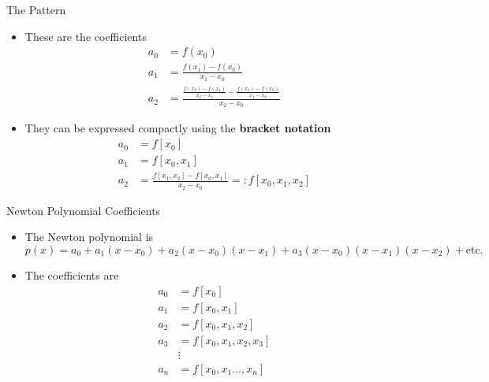 \documentclass[10pt]{beamer}
\begin{document}
\begin{frame}{The Pattern}
\begin{itemize}
    \item These are the coefficients 
\begin{align*}
  a_0 &  = f(x_0)\\
  a_1 & = \frac{f(x_1)-f(x_0)}{x_1 - x_0}\\
  a_2 & = \frac{\frac{f(x_2)-f(x_1)}{x_2-x_1} - \frac{f(x_1)-f(x_0)}{x_1-x_0} }{x_2-x_0}
\end{align*}

\item They can be expressed compactly using the \textbf{bracket notation}
\begin{align*}
  a_0 &  = f[x_0]\\
  a_1 & = f[x_0,x_1]\\
  a_2 & = \frac{f[x_1, x_2] - f[x_0, x_1] }{x_2-x_0} =: f[x_0, x_1, x_2]
\end{align*}

\end{itemize}
\end{frame}
\begin{frame}{Newton Polynomial Coefficients}
\begin{itemize}
    \item The Newton polynomial is 
    $$
    p(x) = a_0 + a_1(x-x_0) + a_2(x-x_0)(x-x_1)+a_3(x-x_0)(x-x_1)(x-x_2) + \text{etc.}
    $$
    \item The coefficients are
    \begin{align*}
  a_0 &  = f[x_0]\\
  a_1 & = f[x_0,x_1]\\
  a_2 & =  f[x_0, x_1, x_2]\\
  a_3 & =  f[x_0, x_1, x_2,x_3]\\
  & \vdots\\ 
  a_n &= f[x_0,x_1\dots ,x_n]
\end{align*}
\end{itemize}
\end{frame}
\end{document}
